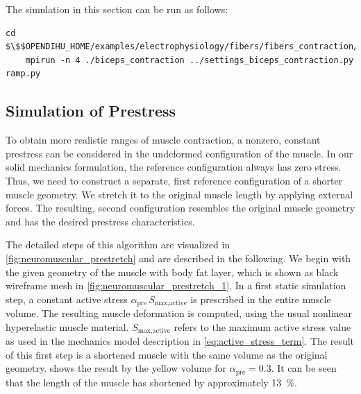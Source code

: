 \begin{reproduce}
  The simulation in this section can be run as follows:
  \begin{lstlisting}[columns=fullflexible,breaklines=true,postbreak=\mbox{\textcolor{gray}{$\hookrightarrow$}\space}]
    cd $\$$OPENDIHU_HOME/examples/electrophysiology/fibers/fibers_contraction/no_precice/build_release
    mpirun -n 4 ./biceps_contraction ../settings_biceps_contraction.py ramp.py
  \end{lstlisting}
\end{reproduce}

\subsection{Simulation of Prestress}\label{sec:prestress_contraction}

To obtain more realistic ranges of muscle contraction, a nonzero, constant prestress can be considered in the undeformed configuration of the muscle. 
In our solid mechanics formulation, the reference configuration always has zero stress. Thus, we need to construct a separate, first reference configuration of a shorter muscle geometry. We stretch it to the original muscle length by applying external forces. The resulting, second configuration resembles the original muscle geometry and has the desired prestress characteristics.

The detailed steps of this algorithm are visualized in \cref{fig:neuromuscular_prestretch} and are described in the following.
We begin with the given geometry of the muscle with body fat layer, which is shown as black wireframe mesh in \cref{fig:neuromuscular_prestretch_1}. In a first static simulation step, a constant active stress $\alpha_\text{pre}\,S_\text{max,active}$ is prescribed in the entire muscle volume. The resulting muscle deformation is computed, using the usual nonlinear hyperelastic muscle material. $S_\text{max,active}$ refers to the maximum active stress value as used in the mechanics model description in \cref{eq:active_stress_term}. The result of this first step is a shortened muscle with the same volume as the original geometry.  shows the result by the yellow volume for $\alpha_\text{pre}=0.3$. It can be seen that the length of the muscle has shortened by approximately \SI{13}{\percent}.


